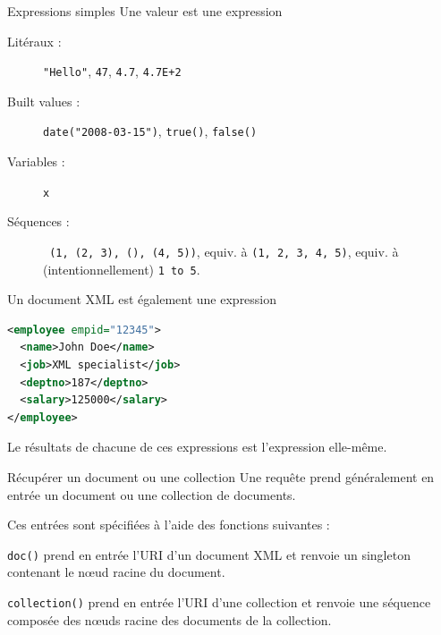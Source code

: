 \begin{frame}[containsverbatim]{Expressions simples }
Une valeur est une expression

\begin{description}
\item[Litéraux :] \lstinline!"Hello"!, \lstinline?47?, \lstinline?4.7?, \lstinline?4.7E+2?
\item[Built values :] \lstinline?date("2008-03-15")?, \lstinline?true()?, \lstinline?false()?
\item[Variables :] \lstinline?x?
\item[Séquences :] \lstinline? (1, (2, 3), (), (4, 5))?, equiv. à \lstinline?(1, 2, 3, 4, 5)?, equiv. à (intentionnellement) \lstinline?1 to 5?.
\end{description}

Un document XML est également une expression
\begin{lstlisting}[language=XML]
<employee empid="12345"> 
  <name>John Doe</name> 
  <job>XML specialist</job>
  <deptno>187</deptno>
  <salary>125000</salary> 
</employee>
\end{lstlisting}

Le résultats de chacune de ces expressions est l'expression elle-même.
\end{frame}


\begin{frame}{Récupérer un document ou une collection}
Une requête prend généralement en entrée un document ou une collection de documents.

\bigskip

Ces entrées sont spécifiées à l'aide des fonctions suivantes : 

\medskip

\lstinline!doc()! prend en entrée l'URI d'un document XML et renvoie un singleton contenant le n{\oe}ud racine du document.\\

\medskip

\lstinline!collection()! prend en entrée l'URI d'une collection et renvoie une séquence composée des n{\oe}uds racine des documents de la collection.

\end{frame}


